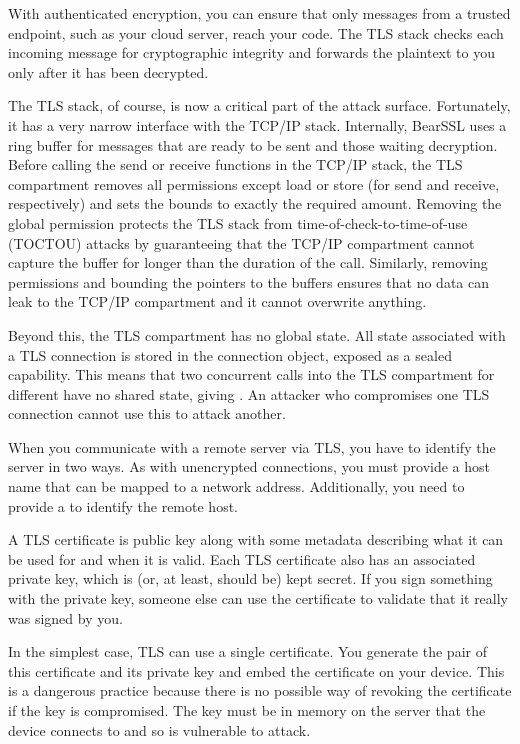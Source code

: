 With authenticated encryption, you can ensure that only messages from a trusted endpoint, such as your cloud server, reach your code.
The TLS stack checks each incoming message for cryptographic integrity and forwards the plaintext to you only after it has been decrypted.

The TLS stack, of course, is now a critical part of the attack surface.
Fortunately, it has a very narrow interface with the TCP/IP stack.
Internally, BearSSL uses a ring buffer for messages that are ready to be sent and those waiting decryption.
Before calling the send or receive functions in the TCP/IP stack, the TLS compartment removes all permissions except load or store (for send and receive, respectively) and sets the bounds to exactly the required amount.
Removing the global permission protects the TLS stack from time-of-check-to-time-of-use (TOCTOU) attacks by guaranteeing that the TCP/IP compartment cannot capture the buffer for longer than the duration of the call.
Similarly, removing permissions and bounding the pointers to the buffers ensures that no data can leak to the TCP/IP compartment and it cannot overwrite anything.

Beyond this, the TLS compartment has no global state.
All state associated with a TLS connection is stored in the connection object, exposed as a sealed capability.
This means that two concurrent calls into the TLS compartment for different have no shared state, giving .
An attacker who compromises one TLS connection cannot use this to attack another.

When you communicate with a remote server via TLS, you have to identify the server in two ways.
As with unencrypted connections, you must provide a host name that can be mapped to a network address.
Additionally, you need to provide a  to identify the remote host.

A TLS certificate is public key along with some metadata describing what it can be used for and when it is valid.
Each TLS certificate also has an associated private key, which is (or, at least, should be) kept secret.
If you sign something with the private key, someone else can use the certificate to validate that it really was signed by you.

In the simplest case, TLS can use a single certificate.
You generate the pair of this certificate and its private key and embed the certificate on your device.
This is a dangerous practice because there is no possible way of revoking the certificate if the key is compromised.
The key must be in memory on the server that the device connects to and so is vulnerable to attack.


